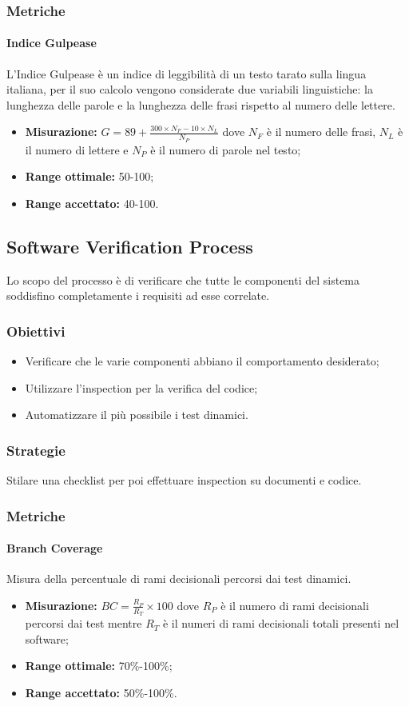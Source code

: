 		\subsubsection{Metriche}
			\paragraph{Indice Gulpease} \Spazio
			L'Indice Gulpease è un indice di leggibilità di un testo tarato sulla lingua italiana, per il suo calcolo vengono considerate due variabili linguistiche: la lunghezza delle parole e la lunghezza delle frasi rispetto al numero delle lettere.
			\begin{itemize}
				\item \textbf{Misurazione:} $G=89+\frac{300\times N_F-10\times N_L}{N_P}$ dove $N_F$ è il numero delle frasi, $N_L$ è il numero di lettere e $N_P$ è il numero di parole nel testo;
				\item \textbf{Range ottimale:} 50-100;
				\item \textbf{Range accettato:} 40-100.
			\end{itemize}

	\subsection{Software Verification Process}
	Lo scopo del processo è di verificare che tutte le componenti del sistema soddisfino completamente i requisiti ad esse correlate.
		\subsubsection{Obiettivi}
		\begin{itemize}
			\item Verificare che le varie componenti abbiano il comportamento desiderato;
			\item Utilizzare l'inspection per la verifica del codice;
			\item Automatizzare il più possibile i test dinamici.
		\end{itemize}
		\subsubsection{Strategie}
		Stilare una checklist per poi effettuare inspection su documenti e codice.
		\subsubsection{Metriche}
			\paragraph{Branch Coverage}  \Spazio
			Misura della percentuale di rami decisionali percorsi dai test dinamici.
			\begin{itemize}
				\item \textbf{Misurazione:} $BC=\frac{R_P}{R_T}\times 100$ dove $R_P$ è il numero di rami decisionali percorsi dai test mentre $R_T$ è il numeri di rami decisionali totali presenti nel software;
				\item \textbf{Range ottimale:} 70\%-100\%;
				\item \textbf{Range accettato:} 50\%-100\%.
		    \end{itemize}
